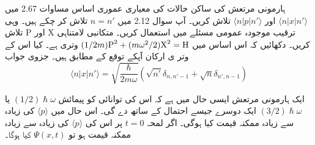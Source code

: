 ہارمونی مرتعش کی ساکن حالات کی معیاری عموری اساس مساوات 2.67
میں
\(\langle n|x|n'\rangle\)
اور
\(\langle n|p|n'\rangle\)
تلاش کریں۔ آپ سوال 2.12 میں
\(n=n'\)
تلاش کر چکے ہیں۔ وہی ترقیب موجودہ عمومی مسئلے میں استعمال کریں۔ متکانبی لامتناہی
\(\text{X}\)
اور
\(\text{P}\)
تلاش کریں۔ دکھائیں کہ اس اساس میں
\((1/2m)\text{\text{P}}^{2}+(m\omega^{2}/2)\text{\text{X}}^{2}=\text{\text{H}}\)
وتری ہے۔ کیا اس کے وتر ی ارکان آپکے توقع کے مطابق ہیں۔
جزوی جواب
\[\langle n|x|n'\rangle=\sqrt{\frac{\hslash}{2m\omega}}(\sqrt{n'}\delta_{n,n'-1}+\sqrt{n}\delta_{n',n-1})\]

ایک ہارمونی مرتعش ایسی حال میں ہے کہ اس کی توانائی کو پیمائش
\((1/2)\hslash\omega\)
یا
\((3/2)\hslash\omega\)
ایک دوسرے جیسے احتمال کے ساتھ دے گی۔ اس حال میں
\(\langle p\rangle\)
کی زیادہ سے زیادہ ممکنہ قیمت کیا ہوگی۔ اگر لمحہ
\(t=0\)
پر اس کی
\(\langle p\rangle\)
کی زیادہ سے زیادہ ممکنہ قیمت ہو تو
\(\Psi(x,t)\)
کیا ہوگا۔

